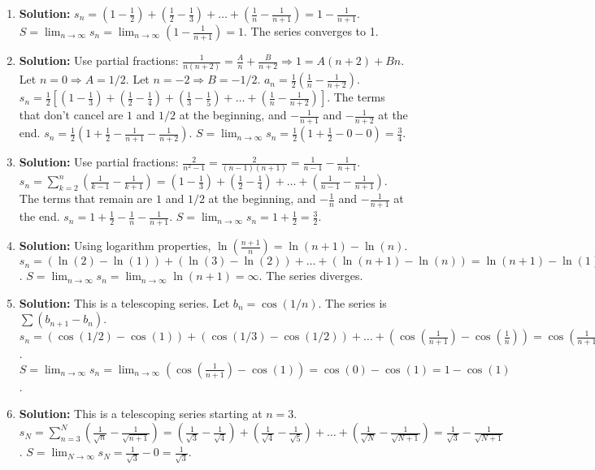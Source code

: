 \documentclass[12pt]{article}
\begin{document}
\begin{enumerate}
    \item \textbf{Solution:} $s_n = (1 - \frac{1}{2}) + (\frac{1}{2} - \frac{1}{3}) + \dots + (\frac{1}{n} - \frac{1}{n+1}) = 1 - \frac{1}{n+1}$.
    $S = \lim_{n\to\infty} s_n = \lim_{n\to\infty} (1 - \frac{1}{n+1}) = 1$. The series converges to 1.
    
    \item \textbf{Solution:} Use partial fractions: $\frac{1}{n(n+2)} = \frac{A}{n} + \frac{B}{n+2} \Rightarrow 1 = A(n+2) + Bn$. Let $n=0 \Rightarrow A=1/2$. Let $n=-2 \Rightarrow B=-1/2$.
    $a_n = \frac{1}{2}\left(\frac{1}{n} - \frac{1}{n+2}\right)$.
    $s_n = \frac{1}{2}\left[ (1 - \frac{1}{3}) + (\frac{1}{2} - \frac{1}{4}) + (\frac{1}{3} - \frac{1}{5}) + \dots + (\frac{1}{n} - \frac{1}{n+2}) \right]$.
    The terms that don't cancel are $1$ and $1/2$ at the beginning, and $-\frac{1}{n+1}$ and $-\frac{1}{n+2}$ at the end.
    $s_n = \frac{1}{2}\left(1 + \frac{1}{2} - \frac{1}{n+1} - \frac{1}{n+2}\right)$.
    $S = \lim_{n\to\infty} s_n = \frac{1}{2}(1 + \frac{1}{2} - 0 - 0) = \frac{3}{4}$.

    \item \textbf{Solution:} Use partial fractions: $\frac{2}{n^2 - 1} = \frac{2}{(n-1)(n+1)} = \frac{1}{n-1} - \frac{1}{n+1}$.
    $s_n = \sum_{k=2}^n (\frac{1}{k-1} - \frac{1}{k+1}) = (1 - \frac{1}{3}) + (\frac{1}{2} - \frac{1}{4}) + \dots + (\frac{1}{n-1} - \frac{1}{n+1})$.
    The terms that remain are $1$ and $1/2$ at the beginning, and $-\frac{1}{n}$ and $-\frac{1}{n+1}$ at the end.
    $s_n = 1 + \frac{1}{2} - \frac{1}{n} - \frac{1}{n+1}$.
    $S = \lim_{n\to\infty} s_n = 1 + \frac{1}{2} = \frac{3}{2}$.

    \item \textbf{Solution:} Using logarithm properties, $\ln(\frac{n+1}{n}) = \ln(n+1) - \ln(n)$.
    $s_n = (\ln(2)-\ln(1)) + (\ln(3)-\ln(2)) + \dots + (\ln(n+1) - \ln(n)) = \ln(n+1) - \ln(1) = \ln(n+1)$.
    $S = \lim_{n\to\infty} s_n = \lim_{n\to\infty} \ln(n+1) = \infty$. The series diverges.
    
    \item \textbf{Solution:} This is a telescoping series. Let $b_n = \cos(1/n)$. The series is $\sum (b_{n+1}-b_n)$.
    $s_n = (\cos(1/2) - \cos(1)) + (\cos(1/3) - \cos(1/2)) + \dots + (\cos(\frac{1}{n+1}) - \cos(\frac{1}{n})) = \cos(\frac{1}{n+1}) - \cos(1)$.
    $S = \lim_{n\to\infty} s_n = \lim_{n\to\infty} (\cos(\frac{1}{n+1}) - \cos(1)) = \cos(0) - \cos(1) = 1 - \cos(1)$.

    \item \textbf{Solution:} This is a telescoping series starting at $n=3$.
    $s_N = \sum_{n=3}^N (\frac{1}{\sqrt{n}} - \frac{1}{\sqrt{n+1}}) = (\frac{1}{\sqrt{3}} - \frac{1}{\sqrt{4}}) + (\frac{1}{\sqrt{4}} - \frac{1}{\sqrt{5}}) + \dots + (\frac{1}{\sqrt{N}} - \frac{1}{\sqrt{N+1}}) = \frac{1}{\sqrt{3}} - \frac{1}{\sqrt{N+1}}$.
    $S = \lim_{N\to\infty} s_N = \frac{1}{\sqrt{3}} - 0 = \frac{1}{\sqrt{3}}$.
    

\end{enumerate}
\end{document}
